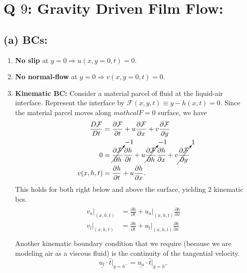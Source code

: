 \documentclass{article}
\begin{document}
\section{Q $9$: Gravity Driven Film Flow:}
\subsection*{(a) BCs:}
\begin{enumerate}
 \item \textbf{No slip} at $y = 0 \Rightarrow u(x, y=0, t) = 0$.
 \item \textbf{No normal-flow} at $y = 0 \Rightarrow v(x, y=0, t) = 0$.
 \item \textbf{Kinematic BC:} Consider a material parcel of fluid at the liquid-air interface. Represent the interface by $\mathcal{F}(x, y, t) \equiv y - h(x, t) = 0$. Since the material parcel moves along $mathcal{F} = 0$ surface, we have
 \begin{align}\label{eq:kinematic_bc}
  \begin{split}
   \frac{D\mathcal{F}}{Dt} & = \frac{\partial \mathcal{F}}{\partial t} + u\frac{\partial \mathcal{F} }{\partial x} + v\frac{\partial \mathcal{F} }{\partial y} \\
   0 &= \cancelto{-1}{\frac{\partial \mathcal{F} }{\partial h}} \frac{\partial h}{\partial t} + u \cancelto{-1}{\frac{\partial \mathcal{F} }{\partial h}} \frac{\partial h}{\partial x} + v \cancelto{1}{\frac{\partial \mathcal{F} }{\partial y}} \\
   v (x, h, t) &= \frac{\partial h}{\partial t} + u \frac{\partial h}{\partial x}.
  \end{split}
 \end{align}
 This holds for both right below and above the surface, yielding $2$ kinematic bcs.
 \begin{align}\label{eq:kinematic_bcs}
 \begin{split}
  v_{a}\bigg|_{(x, h, t)} &= \frac{\partial h}{\partial t} + u_{a}|_{(x, h, t)} \frac{\partial h}{\partial x} \\
  v_{l}\bigg|_{(x, h, t)} &= \frac{\partial h}{\partial t} + u_{l}|_{(x, h, t)} \frac{\partial h}{\partial x} \\
 \end{split}
 \end{align}
Another kinematic boundary condition that we require (because we are modeling air as a viscous fluid) is the continuity of the tangential velocity. 
\begin{equation}\label{eq:third_kinematic_bc}
 \underline{u_{l}}\cdot \hat{t}\big|_{y = h^{-}} = \underline{u_{a}}\cdot \hat{t}\big|_{y = h^{+}}
\end{equation}


\end{enumerate}
\end{document}

